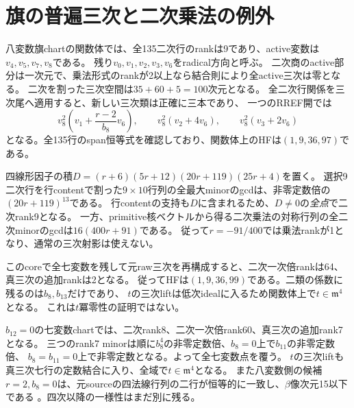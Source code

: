 \documentclass[11pt,a4paper]{ltjsarticle}
\theoremstyle{remark}
\begin{document}
\section{旗の普遍三次と二次乗法の例外}
八変数旗chartの関数体では、全135二次行のrankは9であり、active変数は$v_4,v_5,v_7,v_8$である。
残り$v_0,v_1,v_2,v_3,v_6$をradical方向と呼ぶ。
二次商のactive部分は一次元で、乗法形式のrankが2以上なら結合則により全active三次は零となる。
二次を割った三次空間は$35+60+5=100$次元となる。
全二次行関係を三次尾へ適用すると、新しい三次類は正確に三本であり、
一つのRREF開では
\[
 v_8^2\left(v_1+\frac{r-2}{b_8}v_6\right),\qquad
 v_8^2(v_2+4v_6),\qquad v_8^2(v_3+2v_6)
\]
となる。全135行のspan恒等式を確認しており、関数体上のHFは$(1,9,36,97)$である\cite{flag-eight-v46}。

四線形因子の積$D=(r+6)(5r+12)(20r+119)(25r+4)$を置く。
選択9二次行を行contentで割った$9\times10$行列の全最大minorのgcdは、非零定数倍の$(20r+119)^{13}$である。
行contentの支持も$D$に含まれるため、$D\ne0$の\emph{全点}で二次rank9となる。
一方、primitive核ベクトルから得る二次乗法の対称行列の全二次minorのgcdは$16(400r+91)$である。
従って$r=-91/400$では乗法rankが1となり、通常の三次射影は使えない\cite{flag-quad-cover-v46}。

このcoreで全七変数を残して元raw三次を再構成すると、二次一次倍rankは64、真三次の追加rankは2となる。
従ってHFは$(1,9,36,99)$である。二類の係数に残るのは$b_8,b_{13}$だけであり、
$t$の三次liftは低次idealに入るため関数体上で$t\in\mathfrak m^4$となる\cite{flag-socle-v46}。
これは$t$冪零性の証明ではない。

$b_{12}=0$の七変数chartでは、二次rank8、二次一次倍rank60、真三次の追加rank7となる。
三つのrank7 minorは順に$b_8^4$の非零定数倍、$b_8=0$上で$b_{11}$の非零定数倍、
$b_8=b_{11}=0$上で非零定数となる。よって全七変数点を覆う。
$t$の三次liftも真三次七行の定数結合に入り、全域で$t\in\mathfrak m^4$となる。
また八変数側の候補$r=2,b_8=0$は、元sourceの四法線行列の二行が恒等的に一致し、$\beta$像次元15以下である
\cite{flag-zero12-v46}。四次以降の一様性はまだ別に残る。
\end{document}
